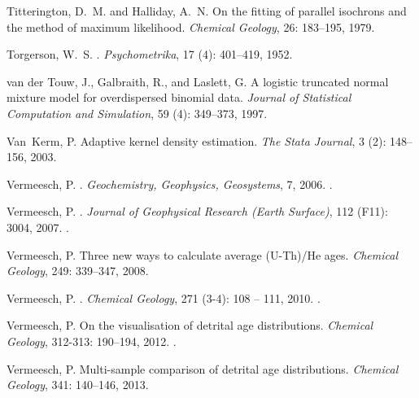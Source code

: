 \documentclass{article}
\begin{document}
\begin{thebibliography}{78}
Titterington, D.~M. and Halliday, A.~N.
\newblock On the fitting of parallel isochrons and the method of maximum
  likelihood.
\newblock \emph{Chemical Geology}, 26: 183--195, 1979.

Torgerson, W.~S.
.
\newblock \emph{Psychometrika}, 17 (4): 401--419, 1952.

{van der Touw}, J., Galbraith, R., and Laslett, G.
\newblock A logistic truncated normal mixture model for overdispersed binomial
  data.
\newblock \emph{Journal of Statistical Computation and Simulation}, 59
  (4): 349--373, 1997.

Van~Kerm, P.
\newblock Adaptive kernel density estimation.
\newblock \emph{The Stata Journal}, 3 (2): 148--156, 2003.

{Vermeesch}, P.
.
\newblock \emph{Geochemistry, Geophysics, Geosystems}, 7, 2006.
\newblock {}.

Vermeesch, P.
.
\newblock \emph{Journal of Geophysical Research (Earth Surface)}, 112
  (F11): 3004, 2007.
\newblock {}.

Vermeesch, P.
\newblock Three new ways to calculate average ({U}-{T}h)/{H}e ages.
\newblock \emph{Chemical Geology}, 249: 339--347, 2008.

Vermeesch, P.
.
\newblock \emph{Chemical Geology}, 271 (3-4): 108 -- 111,
  2010.
\newblock {}.

Vermeesch, P.
\newblock On the visualisation of detrital age distributions.
\newblock \emph{Chemical Geology}, 312-313: 190--194, 2012.
\newblock {}.

Vermeesch, P.
\newblock Multi-sample comparison of detrital age distributions.
\newblock \emph{Chemical Geology}, 341: 140--146, 2013.


\end{thebibliography}
\end{document}
